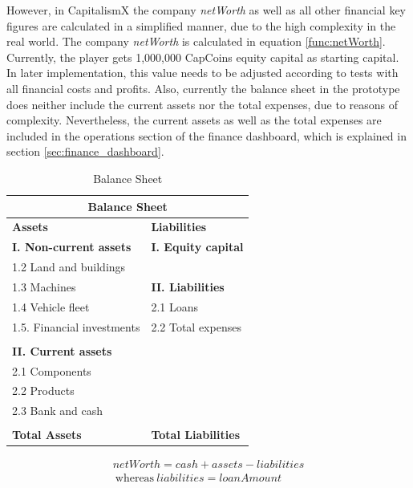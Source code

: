 However, in CapitalismX the company \textit{netWorth} as well as all other financial key figures are calculated in a simplified manner, due to the high complexity in the real world. The company \textit{netWorth} is calculated in equation \ref{func:netWorth}. Currently, the player gets 1,000,000 CapCoins equity capital as starting capital. In later implementation, this value needs to be adjusted according to tests with all financial costs and profits. Also, currently the balance sheet in the prototype does neither include the current assets nor the total expenses, due to reasons of complexity. Nevertheless, the current assets as well as the total expenses are included in the operations section of the finance dashboard, which is explained in section \ref{sec:finance_dashboard}.

\begin{table}[ht]
\begin{tabular}{|p{5.8cm}|p{5.8cm}|}
\hline
\multicolumn{2}{|c|}{\textbf{Balance Sheet}}\\
\hline \textbf{Assets} & \textbf{Liabilities}\\ 
\hline \textbf{I. Non-current assets} & \textbf{I. Equity capital}\\
\hline 1.2 Land and buildings &\\
\hline 1.3 Machines & \textbf{II. Liabilities}\\
\hline 1.4 Vehicle fleet & 2.1 Loans\\
\hline 1.5. Financial investments &  2.2 Total expenses\\
\hline &\\
\hline \textbf{II. Current assets} &\\
\hline 2.1 Components &\\
\hline 2.2 Products &\\
\hline 2.3 Bank and cash &\\
\hline &\\
\hline \textbf{Total Assets} & \textbf{Total Liabilities}\\
\hline
\end{tabular}
\caption{Balance Sheet}
\label{tab:balanceSheet}
\end{table}

\begin{equation}
\label{func:netWorth}
\begin{split}
    netWorth = cash + assets - liabilities \\ ~\text{whereas}~liabilities = loanAmount
    \end{split}
\end{equation}

